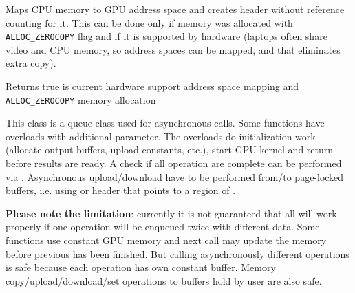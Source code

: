 Maps CPU memory to GPU address space and creates  header without reference counting for it. This can be done only if memory was allocated with \texttt{ALLOC\_ZEROCOPY} flag and if it is supported by hardware (laptops often share video and CPU memory, so address spaces can be mapped, and that eliminates extra copy).


Returns true is current hardware support address space mapping and \texttt{ALLOC\_ZEROCOPY} memory allocation




This class is a queue class used for asynchronous calls. Some functions have overloads with additional  parameter. The overloads do initialization work (allocate output buffers, upload constants, etc.), start GPU kernel and return before results are ready. A check if all operation are complete can be performed via .  Asynchronous upload/download have to be performed from/to page-locked buffers, i.e. using  or  header that points to a region of .

\textbf{Please note the limitation}: currently it is not guaranteed that all will work properly if one operation will be enqueued twice with different data. Some functions use constant GPU memory and next call may update the memory before previous has been finished. But calling asynchronously different operations is safe because each operation has own constant buffer. Memory copy/upload/download/set operations to buffers hold by user are also safe.

